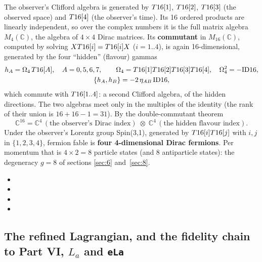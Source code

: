 The observer's Clifford algebra is generated by $T16[1]$, $T16[2]$, $T16[3]$ (the observed
space) and $T16[4]$ (the observer's time). Its 16 ordered products are linearly independent, so
over the complex numbers it is the full matrix algebra $M_4(\mathbb C)$, the algebra of $4\times4$
Dirac matrices. Its \textbf{commutant} in $M_{16}(\mathbb C)$, computed by solving
$XT16[i]=T16[i]X$ ($i=1..4$), is again 16-dimensional, generated by the four ``hidden''
(flavour) gammas
\begin{gather*}
  h_A=\Omega_4\,T16[A],\quad A=0,5,6,7,\qquad
  \Omega_4=T16[1]T16[2]T16[3]T16[4],\quad \Omega_4^2=-\mathrm{ID16},\\
  \{h_A,h_B\}=-2\,\eta_{AB}\,\mathrm{ID16} ,
\end{gather*}
which commute with $T16[1..4]$: a second Clifford algebra, of the hidden directions. The two
algebras meet only in the multiples of the identity (the rank of their union is $16+16-1=31$). By
the double-commutant theorem
\[
  \mathbb C^{16}=\mathbb C^{4}\,(\text{the observer's Dirac index})\;\otimes\;\mathbb C^{4}\,(\text{the hidden flavour index}) .
\]
Under the observer's Lorentz group Spin(3,1), generated by $T16[i]T16[j]$ with $i,j$ in
$\{1,2,3,4\}$, fermion fable is \textbf{four 4-dimensional Dirac fermions}. Per momentum that is
$4\times2=8$ particle states (and 8 antiparticle states): the degeneracy $g=8$ of sections
\ref{sec:6} and~\ref{sec:8}. 
\begin{itemize}
  \item {}
  \item {}
  \item {}
  \item {}
\end{itemize}

\subsection{The refined Lagrangian, and the fidelity chain to Part VI, \texorpdfstring{$L_a$}{La} and \texttt{eLa}}
\label{sec:3.7}

